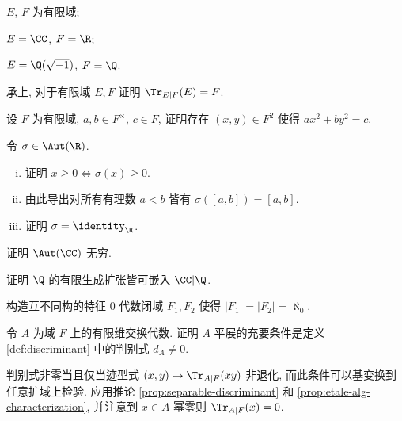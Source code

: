 \begin{Exercises}
		\begin{compactenum}[(i)]
			\item $E$, $F$ 为有限域; 
			\item $E=\CC$, $F=\R$;
			\item $E=\Q(\sqrt{-1})$, $F=\Q$.
		\end{compactenum}
	\item 承上, 对于有限域 $E, F$ 证明 $\Tr_{E|F}(E)=F$.
	\item 设 $F$ 为有限域, $a, b \in F^\times$, $c \in F$, 证明存在 $(x,y) \in F^2$ 使得 $ax^2 + by^2 = c$.
	\item 令 $\sigma \in \Aut(\R)$.
		\begin{enumerate}[(i)]
			\item 证明 $x \geq 0 \iff \sigma(x) \geq 0$. 
			\item 由此导出对所有有理数 $a < b$ 皆有 $\sigma([a,b]) = [a,b]$.
			\item 证明 $\sigma = \identity_{\R}$.
		\end{enumerate}
	\item 证明 $\Aut(\CC)$ 无穷.
	\item 证明 $\Q$ 的有限生成扩张皆可嵌入 $\CC|\Q$.
	\item 构造互不同构的特征 $0$ 代数闭域 $F_1, F_2$ 使得 $|F_1|=|F_2|=\aleph_0$.
	\item 令 $A$ 为域 $F$ 上的有限维交换代数. 证明 $A$ 平展的充要条件是定义 \ref{def:discriminant} 中的判别式 $d_A \neq 0$.
	\begin{hint}
		判别式非零当且仅当迹型式 $(x,y) \mapsto \Tr_{A|F}(xy)$ 非退化, 而此条件可以基变换到任意扩域上检验. 应用推论 \ref{prop:separable-discriminant} 和 \ref{prop:etale-alg-characterization}, 并注意到 $x \in A$ 幂零则 $\Tr_{A|F}(x)=0$.
	\end{hint}
\end{Exercises}
